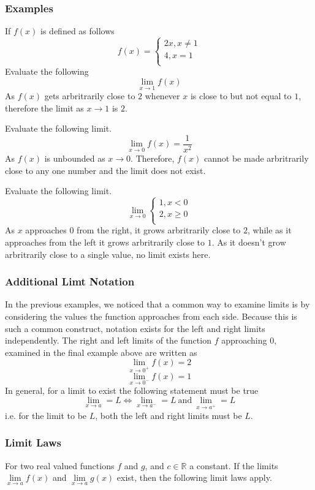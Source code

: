 \documentclass[12pt]{report}
\newcommand{\R}{\mathbb{R}}
\newcommand{\mand}{\:\mathrm{and}\:}
\newcommand{\limit}{\lim\limits}
\begin{document}
\begin{flushleft}
\subsubsection*{Examples}
If \(f(x)\) is defined as follows 
\[
    f(x) =
    \begin{cases}
        2x, x \neq 1 \\
        4, x = 1 \\
    \end{cases}
\]
Evaluate the following
\[\lim_{x\rightarrow 1} f(x)\]
As \(f(x)\) gets arbritrarily close to \(2\) whenever \(x\) is close to but not
equal to \(1\), therefore the limit as \(x\rightarrow1\) is \(2\).

\bigskip\bigskip
Evaluate the following limit.
\[\lim_{x\rightarrow0}f(x) = \frac{1}{x^2}\]
As \(f(x)\) is unbounded as \(x\rightarrow0\). Therefore, \(f(x)\) cannot be 
made arbritrarily close to any one number and the limit does not exist.

\bigskip\bigskip
Evaluate the following limit.
\[
    \lim_{x\rightarrow0}
    \begin{cases}
        1, x < 0 \\
        2, x \geq 0 \\
    \end{cases}
\]
As \(x\) approaches \(0\) from the right, it grows arbritrarily close to \(2\),
while as it approaches from the left it grows arbritrarily close to \(1\). As 
it doesn't grow arbritrarily close to a single value, no limit exists here.

\subsubsection*{Additional Limt Notation}
In the previous examples, we noticed that a common way to examine limits is by
considering the values the function approaches from each side. Because this is
such a common construct, notation exists for the left and right limits
independently. The right and left limits of the function \(f\) approaching 
\(0\), examined in the final example above are written as
\[\lim_{x\rightarrow0^+}f(x) = 2\]
\[\lim_{x\rightarrow0^-}f(x) = 1\]
In general, for a limit to exist the following statement must be true
\[\lim_{x\rightarrow a} = L \Leftrightarrow \lim_{x\rightarrow a^-} = L
\mand \lim_{x\rightarrow a^+} = L\]
i.e. for the limit to be \(L\), both the left and right limits must be \(L\).

\subsubsection*{Limit Laws}
For two real valued functions \(f\) and \(g\), and \(c \in \R\) a constant. If
the limits \(\limit_{x\rightarrow a} f(x)\) and 
\(\limit_{x\rightarrow a} g(x)\) exist, then the following limit laws 
apply.


\end{flushleft}
\end{document}
